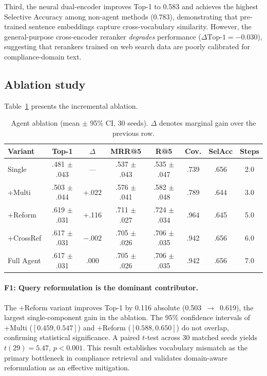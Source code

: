 \documentclass[a4paper,fleqn]{cas-sc}
\begin{document}
Third, the neural dual-encoder improves Top-1 to 0.583 and achieves the highest Selective Accuracy among non-agent methods (0.783), demonstrating that pre-trained sentence embeddings capture cross-vocabulary similarity.
However, the general-purpose cross-encoder reranker \emph{degrades} performance ($\Delta\text{Top-1} = -0.030$), suggesting that rerankers trained on web search data are poorly calibrated for compliance-domain text.


\subsection{Ablation study}

Table~\ref{tab:ablation} presents the incremental ablation.

\begin{table}[t]
\caption{Agent ablation (mean $\pm$ 95\% CI, 30 seeds). $\Delta$ denotes marginal gain over the previous row.}
\label{tab:ablation}
\centering
\small
\begin{tabular}{@{}lccccccc@{}}
\toprule
Variant & Top-1 & $\Delta$ & MRR@5 & R@5 & Cov. & SelAcc & Steps \\
\midrule
Single        & .481 $\pm$ .043 & ---    & .537 $\pm$ .043 & .535 $\pm$ .047 & .739 & .656 & 2.0 \\
+Multi        & .503 $\pm$ .044 & +.022  & .576 $\pm$ .041 & .582 $\pm$ .048 & .789 & .644 & 3.0 \\
+Reform       & .619 $\pm$ .031 & +.116  & .711 $\pm$ .027 & .724 $\pm$ .034 & .964 & .645 & 5.0 \\
+CrossRef     & .617 $\pm$ .031 & $-.002$  & .705 $\pm$ .026 & .706 $\pm$ .035 & .942 & .656 & 6.0 \\
Full Agent    & .617 $\pm$ .031 & .000   & .705 $\pm$ .026 & .706 $\pm$ .035 & .942 & .656 & 7.0 \\
\bottomrule
\end{tabular}
\end{table}


\paragraph{F1: Query reformulation is the dominant contributor.}
The +Reform variant improves Top-1 by 0.116 absolute (0.503~$\rightarrow$~0.619), the largest single-component gain in the ablation.
The 95\% confidence intervals of +Multi ($[0.459, 0.547]$) and +Reform ($[0.588, 0.650]$) do not overlap, confirming statistical significance.
A paired $t$-test across 30 matched seeds yields $t(29) = 5.47$, $p < 0.001$.
This result establishes vocabulary mismatch as the primary bottleneck in compliance retrieval and validates domain-aware reformulation as an effective mitigation.
\end{document}
